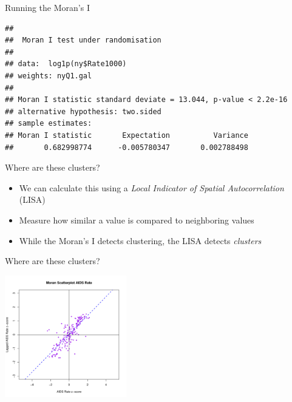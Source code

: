 \documentclass[aspectratio = 169, 12pt]{beamer}\usepackage[]{graphicx}\usepackage[]{color}
\makeatletter
\newenvironment{kframe}{%
 \def\at@end@of@kframe{}%
 \ifinner\ifhmode%
  \def\at@end@of@kframe{\end{minipage}}%
  \begin{minipage}{\columnwidth}%
 \fi\fi%
 \def\FrameCommand##1{\hskip\@totalleftmargin \hskip-\fboxsep
 \colorbox{shadecolor}{##1}\hskip-\fboxsep
     \hskip-\linewidth \hskip-\@totalleftmargin \hskip\columnwidth}%
 \MakeFramed {\advance\hsize-\width
   \@totalleftmargin\z@ \linewidth\hsize
   \@setminipage}}%
 {\par\unskip\endMakeFramed%
 \at@end@of@kframe}
\newenvironment{knitrout}{}{} %
\makeatother
\begin{document}
\begin{frame}[fragile]{Running the Moran's I}
\begin{knitrout}\tiny
{}\color{fgcolor}\begin{kframe}


{\ttfamily\noindent\bfseries\color{errorcolor}{\#\# Error in ogrInfo(dsn = dsn, layer = layer, encoding = encoding, use\_iconv = use\_iconv, : Cannot open data source}}\begin{verbatim}
## 
## 	Moran I test under randomisation
## 
## data:  log1p(ny$Rate1000)  
## weights: nyQ1.gal  
## 
## Moran I statistic standard deviate = 13.044, p-value < 2.2e-16
## alternative hypothesis: two.sided
## sample estimates:
## Moran I statistic       Expectation          Variance 
##       0.682998774      -0.005780347       0.002788498
\end{verbatim}
\end{kframe}
\end{knitrout}
\end{frame}

\begin{frame}{Where are these clusters?}
\begin{itemize}
\item We can calculate this using a \textit{Local Indicator of Spatial Autocorrelation} (LISA)
\item Measure how similar a value is compared to neighboring values
\item While the Moran's I detects clustering, the LISA detects \textit{clusters}
\end{itemize}
\end{frame}

\begin{frame}[fragile]{Where are these clusters?}
\begin{knitrout}
\color{fgcolor}\begin{kframe}


{\ttfamily\noindent\bfseries\color{errorcolor}{\#\# Error in ogrInfo(dsn = dsn, layer = layer, encoding = encoding, use\_iconv = use\_iconv, : Cannot open data source}}\end{kframe}
\includegraphics[width=200px]{figure/unnamed-chunk-6-1} 

\end{knitrout}
\end{frame}
\end{document}
